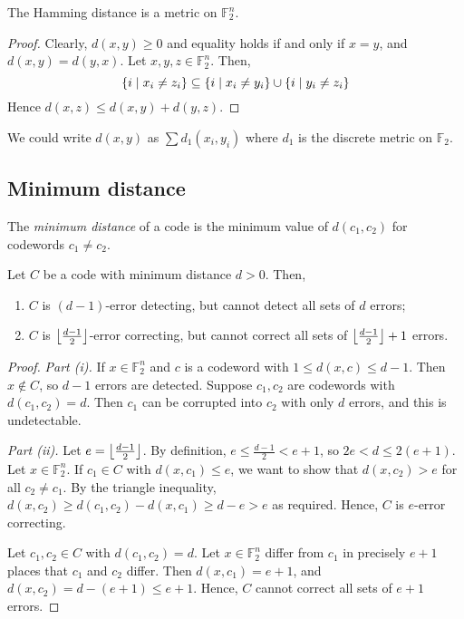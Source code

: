 \begin{lemma}
    The Hamming distance is a metric on \( \mathbb F_2^n \).
\end{lemma}
\begin{proof}
    Clearly, \( d(x,y) \geq 0 \) and equality holds if and only if \( x = y \), and \( d(x,y) = d(y,x) \).
    Let \( x, y, z \in \mathbb F_2^n \).
    Then,
    \[ \qty{i \mid x_i \neq z_i} \subseteq \qty{i \mid x_i \neq y_i} \cup \qty{i \mid y_i \neq z_i} \]
    Hence \( d(x,z) \leq d(x,y) + d(y,z) \).
\end{proof}
\begin{remark}
    We could write \( d(x,y) \) as \( \sum d_1(x_i,y_i) \) where \( d_1 \) is the discrete metric on \( \mathbb F_2 \).
\end{remark}

\subsection{Minimum distance}
\begin{definition}
    The \emph{minimum distance} of a code is the minimum value of \( d(c_1, c_2) \) for codewords \( c_1 \neq c_2 \).
\end{definition}
\begin{lemma}
    Let \( C \) be a code with minimum distance \( d > 0 \).
    Then,
    \begin{enumerate}
        \item \( C \) is \( (d-1) \)-error detecting, but cannot detect all sets of \( d \) errors;
        \item \( C \) is \( \floor*{\frac{d-1}{2}} \)-error correcting, but cannot correct all sets of \( \floor*{\frac{d-1}{2}} + 1 \) errors.
    \end{enumerate}
\end{lemma}
\begin{proof}
    \emph{Part (i).}
    If \( x \in \mathbb F_2^n \) and \( c \) is a codeword with \( 1 \leq d(x,c) \leq d - 1 \).
    Then \( x \not\in C \), so \( d - 1 \) errors are detected.
    Suppose \( c_1, c_2 \) are codewords with \( d(c_1, c_2) = d \).
    Then \( c_1 \) can be corrupted into \( c_2 \) with only \( d \) errors, and this is undetectable.

    \emph{Part (ii).}
    Let \( e = \floor*{\frac{d-1}{2}} \).
    By definition, \( e \leq \frac{d-1}{2} < e + 1 \), so \( 2e < d \leq 2(e+1) \).
    Let \( x \in \mathbb F_2^n \).
    If \( c_1 \in C \) with \( d(x,c_1) \leq e \), we want to show that \( d(x,c_2) > e \) for all \( c_2 \neq c_1 \).
    By the triangle inequality, \( d(x,c_2) \geq d(c_1,c_2) - d(x,c_1) \geq d - e > e \) as required.
    Hence, \( C \) is \( e \)-error correcting.

    Let \( c_1, c_2 \in C \) with \( d(c_1, c_2) = d \).
    Let \( x \in \mathbb F_2^n \) differ from \( c_1 \) in precisely \( e + 1 \) places that \( c_1 \) and \( c_2 \) differ.
    Then \( d(x,c_1) = e + 1 \), and \( d(x,c_2) = d - (e+1) \leq e + 1 \).
    Hence, \( C \) cannot correct all sets of \( e + 1 \) errors.
\end{proof}
